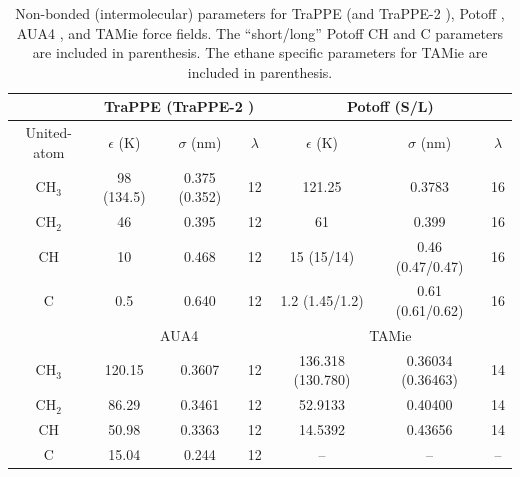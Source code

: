 \documentclass[preprint,letterpaper,floatfix,citeautoscript,aip,jcp]{revtex4-1}
\begin{document}
\begin{table}[h!]
	\caption{Non-bonded (intermolecular) parameters for TraPPE \cite{TraPPE,Martin1999} (and TraPPE-2 \cite{TraPPEUA2}), Potoff \cite{Mie,Potoff_branched}, AUA4 \cite{AUA4,Nieto2008}, and TAMie \cite{TAMie,Weidler2016} force fields. The ``short/long'' Potoff CH and C parameters are included in parenthesis. The ethane specific parameters for TAMie are included in parenthesis.} \label{tab:nonbonded params}
	\begin{center}
		\begin{tabular}{|c|c|c|c|c|c|c|}
			\hline
			\multicolumn{1}{|c}{} & \multicolumn{3}{|c}{TraPPE  (TraPPE-2 )} & \multicolumn{3}{|c|}{Potoff (S/L)}  \\ \hline
			United-atom & $\epsilon$ (K) & $\sigma$ (nm) & $\lambda$ & $\epsilon$ (K) & $\sigma$ (nm) & $\lambda$ \\ \hline
			CH$_3$ & 98 (134.5)  & 0.375 (0.352) & 12 & 121.25 & 0.3783 & 16  \\ 
			CH$_2$ & 46 & 0.395 & 12 & 61 & 0.399 & 16 \\ 
			CH & 10 & 0.468 & 12 & 15 (15/14) & 0.46 (0.47/0.47) & 16\\
			C & 0.5 & 0.640 & 12 & 1.2 (1.45/1.2) & 0.61 (0.61/0.62) & 16\\
			\hline
			\multicolumn{1}{|c}{} & \multicolumn{3}{|c}{AUA4} & \multicolumn{3}{|c|}{TAMie} \\ \hline
			CH$_3$ & 120.15  & 0.3607 & 12 & 136.318 (130.780) & 0.36034 (0.36463) & 14 \\ 
			CH$_2$ & 86.29 & 0.3461 & 12 & 52.9133 & 0.40400 & 14 \\ 
			CH & 50.98 & 0.3363 & 12 & 14.5392 & 0.43656 & 14\\
			C & 15.04 & 0.244 & 12 & -- & -- & --\\
			\hline
		\end{tabular}
	\end{center} 
\end{table}
\end{document}
